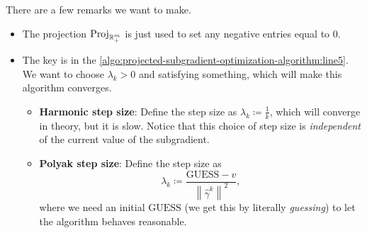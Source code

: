 \begin{remark}
	There are a few remarks we want to make.
	\begin{itemize}
		\item The projection \(\mathrm{Proj}_{\mathbb{\MakeUppercase{R}}^m_+}\) is just used to set any negative entries equal to \(0\).
		\item The key is in the \autoref{algo:projected-subgradient-optimization-algorithm:line5}. We want to choose \(\lambda_{k}>0\) and satisfying something, which will make this algorithm converges.
		      \begin{itemize}
			      \item \textbf{Harmonic step size}: Define the step size as \(\lambda_{k}\coloneqq \frac{1}{k}\), which will converge in theory, but it is slow. Notice that this choice of step size is \emph{independent} of the current value of the subgradient.
			      \item \textbf{Polyak step size}: Define the step size as
			            \[
				            \lambda_{k}\coloneqq \frac{\mathrm{GUESS} - v}{\left\lVert \hat{\gamma}^k\right\rVert^2 },
			            \]
			            where we need an initial \(\mathrm{GUESS}\) (we get this by literally \emph{guessing}) to let the algorithm behaves reasonable.
		      \end{itemize}
	\end{itemize}
\end{remark}